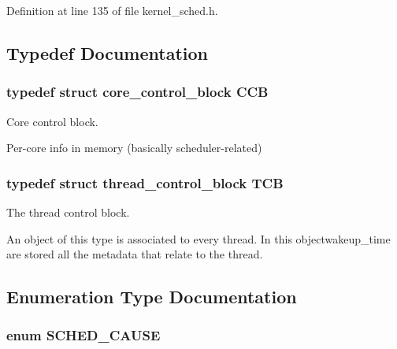 Definition at line 135 of file kernel\+\_\+sched.\+h.



\subsection{Typedef Documentation}
\subsubsection[{\texorpdfstring{C\+CB}{CCB}}]{\setlength{\rightskip}{0pt plus 5cm}typedef struct {\bf core\+\_\+control\+\_\+block}  {\bf C\+CB}}\hypertarget{group__scheduler_ga7485b31e0dd9fd723bc2d75fba5206a0}{}\label{group__scheduler_ga7485b31e0dd9fd723bc2d75fba5206a0}


Core control block. 

Per-\/core info in memory (basically scheduler-\/related) 
\subsubsection[{\texorpdfstring{T\+CB}{TCB}}]{\setlength{\rightskip}{0pt plus 5cm}typedef struct {\bf thread\+\_\+control\+\_\+block}  {\bf T\+CB}}\hypertarget{group__scheduler_gaf88d9c946bf70b36a1e8bc34383abfc9}{}\label{group__scheduler_gaf88d9c946bf70b36a1e8bc34383abfc9}


The thread control block. 

An object of this type is associated to every thread. In this objectwakeup\+\_\+time are stored all the metadata that relate to the thread. 

\subsection{Enumeration Type Documentation}
\subsubsection[{\texorpdfstring{S\+C\+H\+E\+D\+\_\+\+C\+A\+U\+SE}{SCHED_CAUSE}}]{\setlength{\rightskip}{0pt plus 5cm}enum {\bf S\+C\+H\+E\+D\+\_\+\+C\+A\+U\+SE}}\hypertarget{group__scheduler_gaad787d8d80312ffca3c0f197b3a25fbe}{}\label{group__scheduler_gaad787d8d80312ffca3c0f197b3a25fbe}


